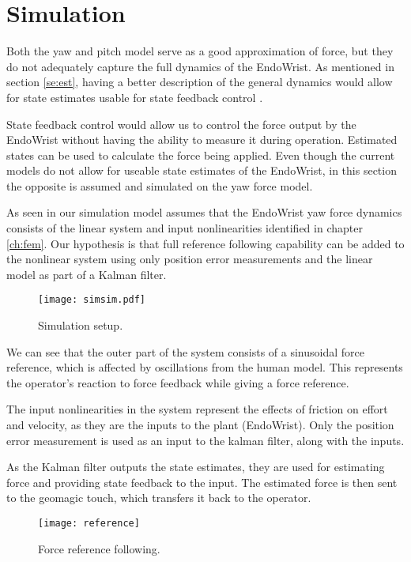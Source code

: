 \section{Simulation}
Both the yaw and pitch model serve as a good approximation of force, but they do not adequately capture the full dynamics of the EndoWrist.
As mentioned in section \ref{se:est}, having a better description of the general dynamics would allow for state estimates usable for state feedback control \cite{yue2004state}.

State feedback control would allow us to control the force output by the EndoWrist without having the ability to measure it during operation.
Estimated states can be used to calculate the force being applied.
Even though the current models do not allow for useable state estimates of the EndoWrist, in this section the opposite is assumed and simulated on the yaw force model.

As seen in  our simulation model assumes that the EndoWrist yaw force dynamics consists of the linear system and input nonlinearities identified in chapter \ref{ch:fem}.
Our hypothesis is that full reference following capability can be added to the nonlinear system using only position error measurements and the linear model as part of a Kalman filter.

\begin{figure}[H]\label{mdle}
\centering
\texttt{[image: simsim.pdf]}
\caption{Simulation setup.}
\end{figure}

We can see that the outer part of the system consists of a sinusoidal force reference, which is affected by oscillations from the human model. 
This represents the operator's reaction to force feedback while giving a force reference.

The input nonlinearities in the system represent the effects of friction on effort and velocity, as they are the inputs to the plant (EndoWrist).
Only the position error measurement is used as an input to the kalman filter, along with the inputs.

As the Kalman filter outputs the state estimates, they are used for estimating force and providing state feedback to the input.
The estimated force is then sent to the geomagic touch, which transfers it back to the operator.

\begin{figure}[H]
\centering
\hspace{-2.5em}\texttt{[image: reference]}
\caption{Force reference following.}
\label{fig:freffl}
\end{figure}

